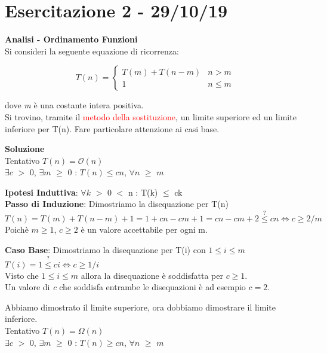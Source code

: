 \documentclass[../cheatSheetAlgoritmi.tex]{subfiles}
\begin{document}
\section{Esercitazione 2 - 29/10/19}
\textbf{Analisi - Ordinamento Funzioni}\\
Si consideri la seguente equazione di ricorrenza:
\begin{center}
	\begin{equation*}
  		T(n)=\begin{cases}
			T(m) +  T(n - m) & \text{$n > m$}\\
			1 & \text{$n \leq m$}	
  		\end{cases}
	\end{equation*}
\end{center}
dove \textit{m} è una costante intera positiva.\\
Si trovino, tramite il \textcolor{red}{metodo della sostituzione}, un limite superiore ed un limite inferiore per T(n). Fare particolare attenzione ai casi base.

\bigskip
\textbf{Soluzione}\\
Tentativo $T(n) = \mathcal{O}(n)$\\
$\exists c$ $>$ 0, $\exists m$ $\geq$ 0 : $T(n) \leq cn$, $\forall n$ $\geq$ $m$

\bigskip
\textbf{Ipotesi Induttiva}: $\forall k$ $>$ 0 $<$ n : T(k) $\leq$ ck\\
\textbf{Passo di Induzione}: Dimostriamo la disequazione per T(n)\\
$T(n) = T(m) + T(n-m) + 1 = 1 + cn - cm + 1 = cn - cm + 2 \stackrel{?}{\leq} cn \iff c \geq 2/m$\\
Poichè $m \geq 1$, $c \geq 2$ è un valore accettabile per ogni m.

\bigskip
\textbf{Caso Base}: Dimostriamo la disequazione per T(i) con $1 \leq i \leq m$\\
$T(i) = 1 \stackrel{?}{\leq} ci \iff c \geq 1/i$\\
Visto che $1 \leq i \leq m$ allora la disequazione è soddisfatta per $c \geq 1$.\\
Un valore di \textit{c} che soddisfa entrambe le disequazioni è ad esempio $c = 2$.

\bigskip
Abbiamo dimostrato il limite superiore, ora dobbiamo dimostrare il limite inferiore.\\
Tentativo $T(n) = \Omega(n)$\\
$\exists c$ $>$ 0, $\exists m$ $\geq$ 0 : $T(n) \geq cn$, $\forall n$ $\geq$ $m$
\end{document}
